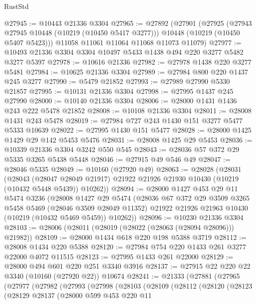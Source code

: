 \begin{lexlean}{RustStd}
\begin{coremodule}
@27945 := @10443 @21336 @3304
@27965 := @27892
    (@27901
      (@27925
        (@27943 @27945 @10448 (@10219 (@10450 @5417 @3277)))
        @10448
        (@10219 (@10450 @5407 @5423)))
      @11058
      @11061
      @11064
      @11068
      @11073
      @11079)
@27977 := @10493 @21336 @3304 @3304 @10497 @5433 @1438 @494 @220 @3277 @5482 @3277 @5397
@27978 := @10616 @21336
@27982 := @27978 @1438 @220 @3277 @5481
@27984 := @10625 @21336 @3304
@27989 := @27984 @800 @220 @1437 @245 @3277
@27990 := @5479 @21852
@27993 := @27989 @27990 @5330 @21857
@27995 := @10131 @21336 @3304
@27998 := @27995 @1437 @245 @27990
@28000 := @10140 @21336 @3304
@28006 := @28000 @1431 @1436 @243 @222 @5478 @21852
@28008 := @10108 @21336 @3304
@28011 := @28008 @1431 @243 @5478
@28019 := @27984 @727 @243 @1430 @151 @3277 @5477 @5333 @10639
@28022 := @27995 @1430 @151 @5477
@28028 := @28000 @1425 @1429 @29 @142 @5453 @5476
@28031 := @28008 @1425 @29 @5453
@28036 := @10339 @21336 @3304 @3242 @550 @545
@28043 := @28036 @57 @372 @29 @5335 @3265 @5438 @5448
@28046 := @27915 @49 @546 @49
@28047 := @28046 @5335
@28049 := @10160 (@27920 @49)
@28063 := @28028
    (@28031
      (@28043
        (@28047 @28049 @21917)
        @21922
        @21926
        @21930
        @10430
        (@10219 (@10432 @5448 @5439))
        @10262))
@28094 := @28000
    @1427
    @453
    @29
    @11
    @5474
    @3236
    (@28008
      @1427
      @29
      @5474
      (@28036
        @67
        @372
        @29
        @3509
        @3265
        @5458
        @5469
        (@28046 @3509 @28049 @11352)
        @21922
        @21926
        @21963
        @10430
        (@10219 (@10432 @5469 @5459))
        @10262))
@28096 := @10230 @21336 @3304
@28103 := @28006 (@28011 (@28019 (@28022 (@28063 (@28094 @28096))) @21982))
@28109 := @28000 @1434 @618 @220 @198 @5388 @3719
@28112 := @28008 @1434 @220 @5388
@28120 := @27984 @754 @220 @1433 @261 @3277 @22000 @4072 @11515
@28123 := @27995 @1433 @261 @22000
@28129 := @28000 @494 @601 @220 @251 @3340 @3916
@28137 := @27915 @22 @220 @22 @3340 (@10160 (@27920 @22)) @10674
@28241 := @21333
    (@27881
      (@27965
        (@27977
          (@27982
            (@27993
              (@27998
                (@28103
                  (@28109
                    (@28112
                      (@28120
                        (@28123
                          (@28129
                            @28137
                            (@28000
                              @599
                              @453
                              @220
                              @11

\end{coremodule}
\end{lexlean}
